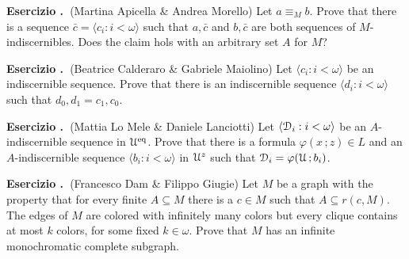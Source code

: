 \documentclass[10pt]{article}
\def\phi{\varphi}
\def\D{\EuScript D}
\def\U{\EuScript U}
\def\<{\langle}
\def\>{\rangle}
\def\eq{{\rm eq}}
\newcounter{ex}
\newenvironment{exercise}{\bigskip\addtocounter{ex}{1}\textbf{Esercizio \theex.\ }}{}
\begin{document}
\begin{exercise}(Martina Apicella \& Andrea Morello)
  Let $a\equiv_M b$.
  Prove that there is a sequence $\bar c=\<c_i:i<\omega\>$ such that $a,\bar c$ and $b,\bar c$ are both sequences of $M$-indiscernibles.
  Does the claim hols with an arbitrary set $A$ for $M$?
\end{exercise}


\begin{exercise}(Beatrice Calderaro \&	Gabriele Maiolino)
  Let $\<c_i:i<\omega\>$ be an indiscernible sequence.
  Prove that there is an indiscernible sequence $\<d_i:i<\omega\>$ such that $d_0,d_1 = c_1,c_0$.
\end{exercise}


\begin{exercise}(Mattia Lo Mele \& Daniele Lanciotti)
  Let $\<\D_i:i<\omega\>$ be an $A$-indiscernible sequence in $\U^\eq$.
  Prove that there is a formula $\phi(x\,;z)\in L$ and an $A$-indiscernible sequence $\<b_i:i<\omega\>$ in $\U^z$ such that $\D_i=\phi(\U\,;b_i)$.
\end{exercise}

\begin{exercise}(Francesco Dam \& Filippo Giugie)
  Let $M$ be a graph with the property that for every finite $A\subseteq M$ there is a $c\in M$ such that $A\subseteq r(c,M)$.
  The edges of $M$ are colored with infinitely many colors but every clique contains at most $k$ colors, for some fixed $k\in\omega$.
  Prove that $M$ has an infinite monochromatic complete subgraph.
\end{exercise}
\end{document}
